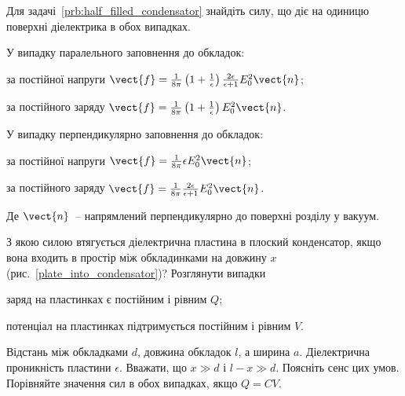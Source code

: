 \begin{problem}
    Для задачі~\ref{prb:half_filled_condensator} знайдіть силу, що діє на одиницю поверхні діелектрика в обох випадках.
	\begin{solution}
		У випадку паралельного заповнення до обкладок:
		\begin{enumerate*}[label=\alph*)]
			\item за постійної напруги
			$\vect{f} = \frac{1}{8\pi}\left( 1+\frac1\epsilon\right) \frac{2\epsilon}{\epsilon + 1} E_0^2 \vect{n}$;
			\item за постійного заряду
			$\vect{f} = \frac{1}{8\pi}\left( 1+\frac1\epsilon\right) E_0^2 \vect{n}$.
		\end{enumerate*}
		У випадку перпендикулярно заповнення до обкладок:
		\begin{enumerate*}[label=\alph*)]
			\item за постійної напруги
			$\vect{f} = \frac{1}{8\pi}\epsilon E_0^2 \vect{n}$;
			\item за постійного заряду
			$\vect{f} = \frac{1}{8\pi} \frac{2\epsilon }{\epsilon + 1} E_0^2 \vect{n}$.
		\end{enumerate*}
		Де $\vect{n}$~-- напрямлений перпендикулярно до поверхні розділу у вакуум.
	\end{solution}
\end{problem}

\begin{problem}\label{prb:plate_into_condensator}
    З якою силою втягується діелектрична пластина в плоский конденсатор, якщо вона входить в простір між обкладинками на довжину $x$ (рис.~\ref{plate_into_condensator})? Розглянути випадки
	\begin{enumerate*}[label=\alph*)]
		\item заряд на пластинках є постійним і рівним $Q$;
		\item потенціал на пластинках підтримується постійним і рівним $V$.
	\end{enumerate*}
	Відстань між обкладками $d$, довжина обкладок $l$, а ширина $a$. Діелектрична проникність пластини $\epsilon$. Вважати, що $x \gg d$ і $l - x \gg d$. Поясніть сенс цих умов. Порівняйте значення сил в обох випадках, якщо $Q = CV$.
\end{problem}

